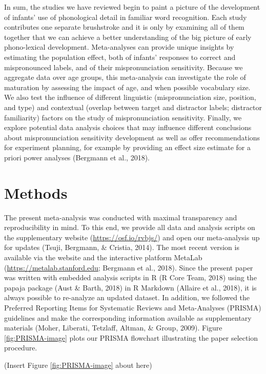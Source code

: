 \documentclass[man, noextraspace]{apa6}
\begin{document}
In sum, the studies we have reviewed begin to paint a picture of the development of infants' use of phonological detail in familiar word recognition. Each study contributes one separate brushstroke and it is only by examining all of them together that we can achieve a better understanding of the big picture of early phono-lexical development. Meta-analyses can provide unique insights by estimating the population effect, both of infants' responses to correct and mispronounced labels, and of their mispronunciation sensitivity. Because we aggregate data over age groups, this meta-analysis can investigate the role of maturation by assessing the impact of age, and when possible vocabulary size. We also test the influence of different linguistic (mispronunciation size, position, and type) and contextual (overlap between target and distractor labels; distractor familiarity) factors on the study of mispronunciation sensitivity. Finally, we explore potential data analysis choices that may influence different conclusions about mispronunciation sensitivity development as well as offer recommendations for experiment planning, for example by providing an effect size estimate for a priori power analyses (Bergmann et al., 2018).

\hypertarget{methods}{%
\section{Methods}\label{methods}}

The present meta-analysis was conducted with maximal transparency and reproducibility in mind. To this end, we provide all data and analysis scripts on the supplementary website (\url{https://osf.io/rvbjs/}) and open our meta-analysis up for updates (Tsuji, Bergmann, \& Cristia, 2014). The most recent version is available via the website and the interactive platform MetaLab (\url{https://metalab.stanford.edu}; Bergmann et al., 2018). Since the present paper was written with embedded analysis scripts in R (R Core Team, 2018) using the papaja package (Aust \& Barth, 2018) in R Markdown (Allaire et al., 2018), it is always possible to re-analyze an updated dataset. In addition, we followed the Preferred Reporting Items for Systematic Reviews and Meta-Analyses (PRISMA) guidelines and make the corresponding information available as supplementary materials (Moher, Liberati, Tetzlaff, Altman, \& Group, 2009). Figure \ref{fig:PRISMA-image} plots our PRISMA flowchart illustrating the paper selection procedure.

(Insert Figure \ref{fig:PRISMA-image} about here)
\end{document}

